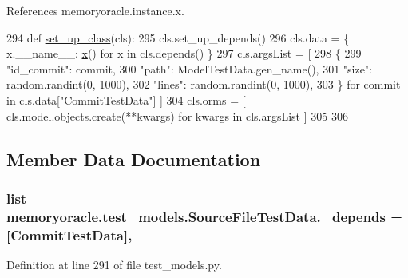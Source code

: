 References memoryoracle.\+instance.\+x.


\begin{DoxyCode}
294     \textcolor{keyword}{def }\hyperlink{classmemoryoracle_1_1test__models_1_1SourceFileTestData_a001f4ac50d6251ceb433508e9e165b6f}{set\_up\_class}(cls):
295         cls.set\_up\_depends()
296         cls.data = \{ x.\_\_name\_\_: \hyperlink{namespacememoryoracle_1_1instance_afe036cc8dc71469743d090c4c80d50c5}{x}() \textcolor{keywordflow}{for} x \textcolor{keywordflow}{in} cls.depends() \}
297         cls.argsList = [
298                 \{
299                     \textcolor{stringliteral}{"id\_commit"}: commit,
300                     \textcolor{stringliteral}{"path"}: ModelTestData.gen\_name(),
301                     \textcolor{stringliteral}{"size"}: random.randint(0, 1000),
302                     \textcolor{stringliteral}{"lines"}: random.randint(0, 1000),
303                 \} \textcolor{keywordflow}{for} commit \textcolor{keywordflow}{in} cls.data[\textcolor{stringliteral}{"CommitTestData"}] ]
304         cls.orms = [ cls.model.objects.create(**kwargs) \textcolor{keywordflow}{for} kwargs \textcolor{keywordflow}{in} cls.argsList ]
305 
306 
\end{DoxyCode}


\subsection{Member Data Documentation}
\hypertarget{classmemoryoracle_1_1test__models_1_1SourceFileTestData_aad89307d3701489b9b2f64a390c14105}{}
\subsubsection[{\+\_\+depends}]{\setlength{\rightskip}{0pt plus 5cm}list memoryoracle.\+test\+\_\+models.\+Source\+File\+Test\+Data.\+\_\+depends = \mbox{[}{\bf Commit\+Test\+Data}\mbox{]}\hspace{0.3cm}{\ttfamily [static]}, {\ttfamily [private]}}\label{classmemoryoracle_1_1test__models_1_1SourceFileTestData_aad89307d3701489b9b2f64a390c14105}


Definition at line 291 of file test\+\_\+models.\+py.

